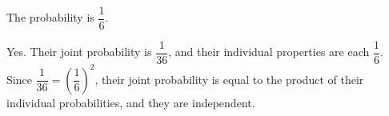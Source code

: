 \documentclass[12pt]{exam}
\begin{document}
\begin{solution}
    \begin{qparts}
        \item The probability is $\dfrac{1}{6}$.
        \item Yes. Their joint probability is $\dfrac{1}{36}$, and their individual properties are each $\dfrac{1}{6}$. Since $\dfrac{1}{36} = \left(\dfrac{1}{6}\right)^2$, their joint probability is equal to the product of their individual probabilities, and they are independent.
    \end{qparts}
\end{solution}
\end{document}
